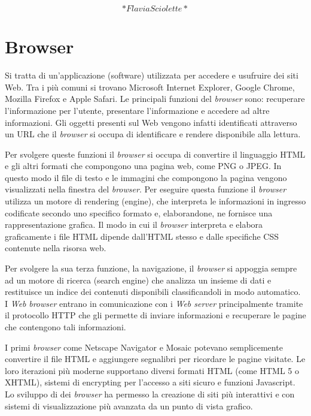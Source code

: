 \documentclass[
  b5paper,
  twoside,
  11pt,
  chapterprefix=false,
  bibliography=totocnumbered,
  parskip=0]{scrbook}
\begin{document}
\[*Flavia Sciolette*\]

\hypertarget{browser}{%
\chapter{Browser}\label{browser}}

Si tratta di un'applicazione (software) utilizzata per accedere e
usufruire dei siti Web. Tra i più comuni si trovano Microsoft Internet
Explorer, Google Chrome, Mozilla Firefox e Apple Safari. Le principali
funzioni del \emph{browser} sono: recuperare l'informazione per l'utente,
presentare l'informazione e accedere ad altre informazioni. Gli oggetti
presenti sul Web vengono infatti identificati attraverso un URL che il
\emph{browser} si occupa di identificare e rendere disponibile alla lettura.

Per svolgere queste funzioni il \emph{browser} si occupa di convertire il
linguaggio HTML e gli altri formati che compongono una pagina web, come
PNG o JPEG. In questo modo il file di testo e le immagini che compongono
la pagina vengono visualizzati nella finestra del \emph{browser}. Per
eseguire questa funzione il \emph{browser} utilizza un motore di rendering
(engine), che interpreta le informazioni in ingresso codificate secondo
uno specifico formato e, elaborandone, ne fornisce una rappresentazione
grafica. Il modo in cui il \emph{browser} interpreta e elabora graficamente i
file HTML dipende dall'HTML stesso e dalle specifiche CSS contenute
nella risorsa web.

Per svolgere la sua terza funzione, la navigazione, il \emph{browser} si
appoggia sempre ad un motore di ricerca (search engine) che analizza un
insieme di dati e restituisce un indice dei contenuti disponibili
classificandoli in modo automatico. I \emph{Web} \emph{browser} entrano in
comunicazione con i \emph{Web server} principalmente tramite il protocollo
HTTP che gli permette di inviare informazioni e recuperare le pagine che
contengono tali informazioni.

I primi \emph{browser} come Netscape Navigator e Mosaic potevano
semplicemente convertire il file HTML e aggiungere segnalibri per
ricordare le pagine visitate. Le loro iterazioni più moderne supportano
diversi formati HTML (come HTML 5 o XHTML), sistemi di encrypting per
l'accesso a siti sicuro e funzioni Javascript. Lo sviluppo di dei
\emph{browser} ha permesso la creazione di siti più interattivi e con sistemi
di visualizzazione più avanzata da un punto di vista grafico.
\end{document}

